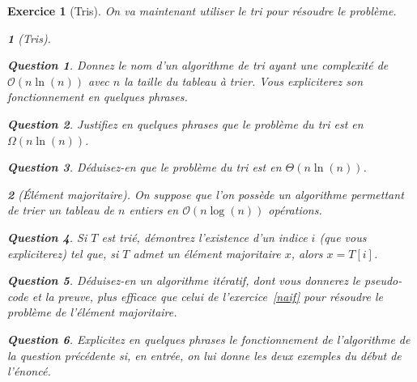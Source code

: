 \documentclass{article}
\theoremstyle{exostyle}
\newtheorem{exo}{Exercice}
\theoremstyle{partiestyle}
\newtheorem{partie}{}[exo]
\theoremstyle{questionstyle}
\newtheorem{questionpartie}{Question}[partie]
\begin{document}
\clearpage
\begin{exo}[Tris]
    On va maintenant utiliser le tri pour résoudre le problème.
    
    \begin{partie}[Tris]
        \begin{questionpartie}
            Donnez le nom d'un algorithme de tri ayant une complexité de $\mathcal{O}(n\ln(n))$ avec $n$ la taille du tableau à trier. Vous expliciterez son fonctionnement en quelques phrases.
        \end{questionpartie}

        \begin{questionpartie}
            Justifiez en quelques phrases que le problème du tri est en $\Omega(n\ln(n))$.
        \end{questionpartie}

        \begin{questionpartie}
            Déduisez-en que le problème du tri est en $\Theta(n\ln(n))$.
        \end{questionpartie}
        \end{partie}
    
        \begin{partie}[Élément  majoritaire]
            On suppose que l'on possède un algorithme permettant de trier un tableau de $n$ entiers en $\mathcal{O}(n \log(n))$ opérations.
            \begin{questionpartie}
                Si $T$ est trié, démontrez l'existence d'un indice $i$ (que vous expliciterez) tel que, si $T$ admet un élément majoritaire $x$, alors $x=T[i]$. 
            \end{questionpartie}
            \begin{questionpartie}
                Déduisez-en un algorithme itératif, dont vous donnerez le pseudo-code et la preuve, plus efficace que celui de l'exercice~\ref{naif} pour résoudre le problème de l'élément majoritaire.            
            \end{questionpartie}
            \begin{questionpartie}
                Explicitez en quelques phrases le fonctionnement de l'algorithme de la question précédente si, en entrée, on lui donne les deux exemples du début de l'énoncé.
            \end{questionpartie}            
        \end{partie}   
    \end{exo}
\end{document}

